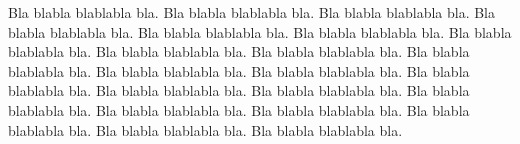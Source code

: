 \documentclass[tcc,capa]{texufpel}
\begin{document}
Bla blabla blablabla bla.  Bla blabla blablabla bla.  Bla blabla
blablabla bla.  Bla blabla blablabla bla.  Bla blabla blablabla bla.
Bla blabla blablabla bla.  Bla blabla blablabla bla.  Bla blabla
blablabla bla.  Bla blabla blablabla bla.  Bla blabla blablabla bla.
Bla blabla blablabla bla.  Bla blabla blablabla bla.  Bla blabla
blablabla bla.  Bla blabla blablabla bla.  Bla blabla blablabla bla.
Bla blabla blablabla bla.  Bla blabla blablabla bla.  Bla blabla
blablabla bla.  Bla blabla blablabla bla.  Bla blabla blablabla bla.
Bla blabla blablabla bla.
\end{document}

